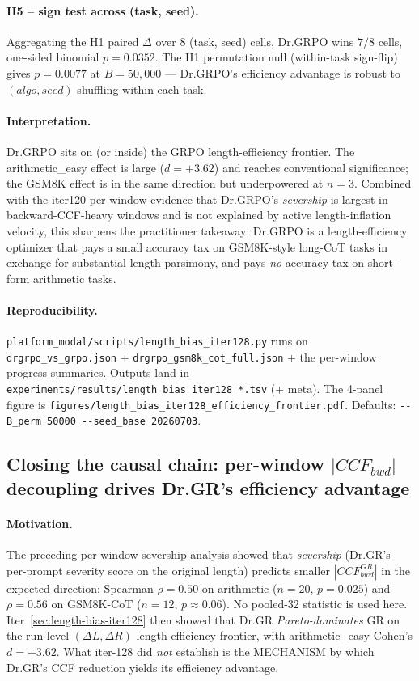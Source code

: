 \documentclass{article}
\begin{document}
\paragraph{H5 -- sign test across (task, seed).}
Aggregating the H1 paired $\Delta$ over 8 (task, seed) cells,
Dr.GRPO wins $7/8$ cells, one-sided binomial $p = 0.0352$.
The H1 permutation null (within-task sign-flip) gives
$p = 0.0077$ at $B{=}50{,}000$ --- Dr.GRPO's efficiency advantage is
robust to $(algo, seed)$ shuffling within each task.

\paragraph{Interpretation.}
Dr.GRPO sits on (or inside) the GRPO length-efficiency frontier.
The arithmetic\_easy effect is large ($d = +3.62$) and reaches
conventional significance; the GSM8K effect is in the same
direction but underpowered at $n{=}3$.  Combined with the iter120
per-window evidence that Dr.GRPO's \emph{severship} is largest in
backward-CCF-heavy windows and is not explained by active
length-inflation velocity, this sharpens the practitioner takeaway:
Dr.GRPO is a length-efficiency
optimizer that pays a small accuracy tax on GSM8K-style long-CoT
tasks in exchange for substantial length parsimony, and pays
\emph{no} accuracy tax on short-form arithmetic tasks.

\paragraph{Reproducibility.}
\verb|platform_modal/scripts/length_bias_iter128.py| runs on
\verb|drgrpo_vs_grpo.json| + \verb|drgrpo_gsm8k_cot_full.json| +
the per-window progress summaries.
Outputs land in
\verb|experiments/results/length_bias_iter128_*.tsv| (+ meta).
The 4-panel figure is \verb|figures/length_bias_iter128_efficiency_frontier.pdf|.
Defaults: \verb|--B_perm 50000 --seed_base 20260703|.
 

\subsection{Closing the causal chain: per-window $|CCF_{bwd}|$ decoupling
drives Dr.GR's efficiency advantage}
\label{sec:length-bias-iter132}

\paragraph{Motivation.}
The preceding per-window severship analysis showed that
\emph{severship} (Dr.GR's per-prompt severity score on the original
length) predicts smaller $|CCF^{GR}_{bwd}|$ in the expected direction:
Spearman $\rho=0.50$ on arithmetic ($n=20$, $p=0.025$) and
$\rho=0.56$ on GSM8K-CoT ($n=12$, $p\approx0.06$). No pooled-32
statistic is used here.
Iter~\ref{sec:length-bias-iter128} then showed that Dr.GR
\emph{Pareto-dominates} GR on the run-level $(\Delta L, \Delta R)$
length-efficiency frontier, with arithmetic\_easy Cohen's $d=+3.62$.
What iter-128 did \emph{not} establish is the MECHANISM by which
Dr.GR's CCF reduction yields its efficiency advantage.
\end{document}
